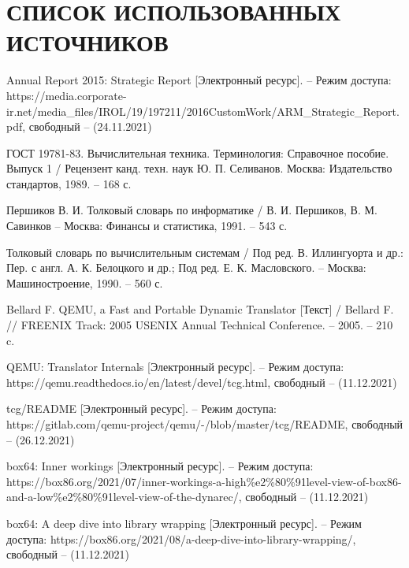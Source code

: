 \section*{СПИСОК ИСПОЛЬЗОВАННЫХ ИСТОЧНИКОВ}

\begingroup
\renewcommand{\section}[2]{}
\begin{thebibliography}{}
	Annual Report 2015: Strategic Report [Электронный ресурс]. -- Режим доступа: https://media.corporate-ir.net/media\_files/IROL/19/197211/2016CustomWork/ARM\_Strategic\_Report.pdf,
	свободный -- (24.11.2021)
		
	 ГОСТ 19781-83. Вычислительная техника. Терминология: Справочное пособие. Выпуск 1 / Рецензент канд. техн. наук Ю. П. Селиванов. Москва: Издательство стандартов, 1989. -- 168 с.
	 
	  Першиков В. И. Толковый словарь по информатике / В. И. Першиков, В. М. Савинков -- Москва: Финансы и статистика, 1991. -- 543 с.
	
	Толковый словарь по вычислительным системам / Под ред. В. Иллингуорта и др.: Пер. с англ. А. К. Белоцкого и др.; Под ред. Е. К. Масловского. -- Москва: Машиностроение, 1990. -- 560 с.
	
	Bellard F. QEMU, a Fast and Portable Dynamic Translator [Текст]  / Bellard F. // FREENIX Track: 2005 USENIX Annual Technical Conference. -- 2005. -- 210 c.
	
QEMU: Translator Internals [Электронный ресурс]. -- Режим доступа: https://qemu.readthedocs.io/en/latest/devel/tcg.html,
свободный -- (11.12.2021)

	tcg/README  [Электронный ресурс]. -- Режим доступа: https://gitlab.com/qemu-project/qemu/-/blob/master/tcg/README,
свободный -- (26.12.2021)


box64: Inner workings [Электронный ресурс]. -- Режим доступа: https://box86.org/2021/07/inner-workings-a-high\%e2\%80\%91level-view-of-box86-and-a-low\%e2\%80\%91level-view-of-the-dynarec/,
свободный -- (11.12.2021)

box64: A deep dive into library wrapping [Электронный ресурс]. -- Режим доступа: https://box86.org/2021/08/a-deep-dive-into-library-wrapping/,
свободный -- (11.12.2021)


\end{thebibliography}
